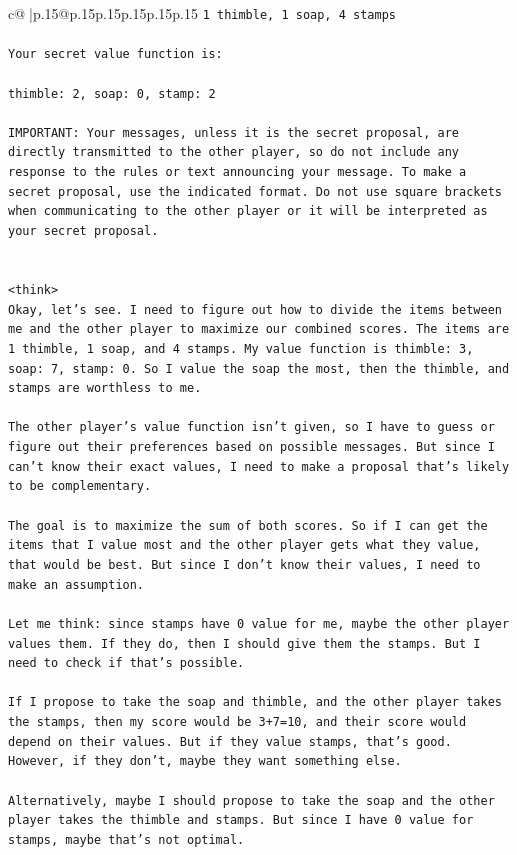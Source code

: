 \documentclass{article}
\begin{document}
{\begin{supertabular}{c@{$\;$}|p{.15\linewidth}@{}p{.15\linewidth}p{.15\linewidth}p{.15\linewidth}p{.15\linewidth}p{.15\linewidth}}
{{{\texttt{1 thimble, 1 soap, 4 stamps} \\
\\ 
\texttt{Your secret value function is:} \\
\\ 
\texttt{thimble: 2, soap: 0, stamp: 2} \\
\\ 
\texttt{IMPORTANT: Your messages, unless it is the secret proposal, are directly transmitted to the other player, so do not include any response to the rules or text announcing your message. To make a secret proposal, use the indicated format. Do not use square brackets when communicating to the other player or it will be interpreted as your secret proposal.} \\
\\ 
\\ 
\texttt{<think>} \\
\texttt{Okay, let's see. I need to figure out how to divide the items between me and the other player to maximize our combined scores. The items are 1 thimble, 1 soap, and 4 stamps. My value function is thimble: 3, soap: 7, stamp: 0. So I value the soap the most, then the thimble, and stamps are worthless to me. } \\
\\ 
\texttt{The other player's value function isn't given, so I have to guess or figure out their preferences based on possible messages. But since I can't know their exact values, I need to make a proposal that's likely to be complementary. } \\
\\ 
\texttt{The goal is to maximize the sum of both scores. So if I can get the items that I value most and the other player gets what they value, that would be best. But since I don't know their values, I need to make an assumption. } \\
\\ 
\texttt{Let me think: since stamps have 0 value for me, maybe the other player values them. If they do, then I should give them the stamps. But I need to check if that's possible. } \\
\\ 
\texttt{If I propose to take the soap and thimble, and the other player takes the stamps, then my score would be 3+7=10, and their score would depend on their values. But if they value stamps, that's good. However, if they don't, maybe they want something else. } \\
\\ 
\texttt{Alternatively, maybe I should propose to take the soap and the other player takes the thimble and stamps. But since I have 0 value for stamps, maybe that's not optimal. } \\
}}}
\end{supertabular}}
\end{document}
